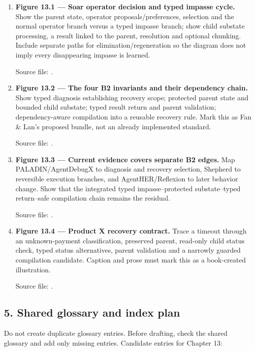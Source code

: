 \begin{enumerate}
\def\labelenumi{\arabic{enumi}.}
\item
  \textbf{Figure 13.1 --- Soar operator decision and typed impasse cycle.} Show the parent state, operator proposals/preferences, selection and the normal operator branch versus a typed impasse branch; show child substate processing, a result linked to the parent, resolution and optional chunking. Include separate paths for elimination/regeneration so the diagram does not imply every disappearing impasse is learned.

  Source file: .
\item
  \textbf{Figure 13.2 --- The four B2 invariants and their dependency chain.} Show typed diagnosis establishing recovery scope; protected parent state and bounded child substate; typed result return and parent validation; dependency-aware compilation into a reusable recovery rule. Mark this as Fan \& Lan's proposed bundle, not an already implemented standard.

  Source file: .
\item
  \textbf{Figure 13.3 --- Current evidence covers separate B2 edges.} Map PALADIN/AgentDebugX to diagnosis and recovery selection, Shepherd to reversible execution branches, and AgentHER/Reflexion to later behavior change. Show that the integrated typed impasse--protected substate--typed return--safe compilation chain remains the residual.

  Source file: .
\item
  \textbf{Figure 13.4 --- Product X recovery contract.} Trace a timeout through an unknown-payment classification, preserved parent, read-only child status check, typed status alternatives, parent validation and a narrowly guarded compilation candidate. Caption and prose must mark this as a book-created illustration.

  Source file: .
\end{enumerate}

\subsection{5. Shared glossary and index plan}\label{shared-glossary-and-index-plan}

Do not create duplicate glossary entries. Before drafting, check the shared glossary and add only missing entries. Candidate entries for Chapter 13:

